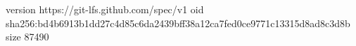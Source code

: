 version https://git-lfs.github.com/spec/v1
oid sha256:bd4b6913b1dd27c4d85c6da2439bff38a12ca7fed0ce9771c13315d8ad8c3d8b
size 87490

